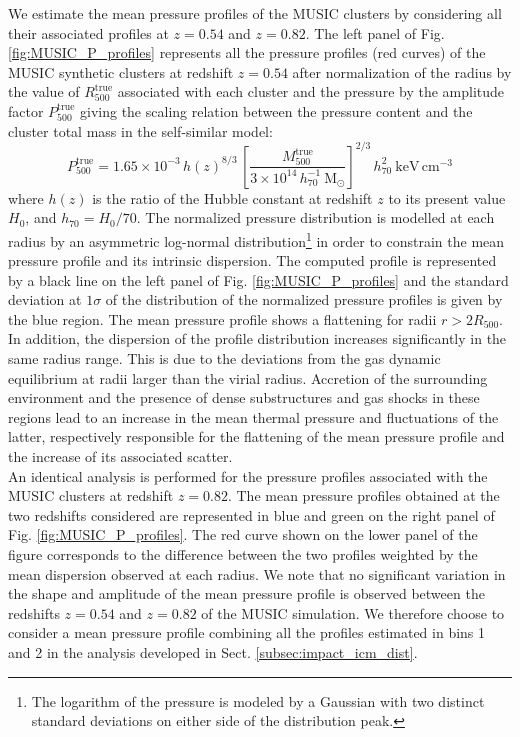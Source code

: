 \documentclass[twocolumn,traditabstract]{aa}
\begin{document}
We estimate the mean pressure profiles of the MUSIC clusters by considering all their associated profiles at $z=0.54$ and $z=0.82$. The left panel of Fig. \ref{fig:MUSIC_P_profiles} represents all the pressure profiles (red curves) of the MUSIC synthetic clusters at redshift $z=0.54$ after normalization of the radius by the value of $R_{500}^{\mathrm{true}}$ associated with each cluster and the pressure by the amplitude factor $P_{500}^{\mathrm{true}}$ giving the scaling relation between the pressure content and the cluster total mass in the self-similar model:
\begin{equation}
P_{500}^{\mathrm{true}} = 1.65 \times 10^{-3} \, h(z)^{8/3} \, \left[ \frac{M_{500}^{\mathrm{true}}}{3 \times 10^{14} \, h_{70}^{-1}~\mathrm{M_{\odot}}}\right]^{2/3} \, h_{70}^2~\mathrm{keV} \, \mathrm{cm^{-3}}
\end{equation}
where $h(z)$ is the ratio of the Hubble constant at redshift $z$ to its present value $H_0$, and $h_{70} = H_0 / 70$. The normalized pressure distribution is modelled at each radius by an asymmetric log-normal distribution\footnote{The logarithm of the pressure is modeled by a Gaussian with two distinct standard deviations on either side of the distribution peak.} in order to constrain the mean pressure profile and its intrinsic dispersion. The computed profile is represented by a black line on the left panel of Fig. \ref{fig:MUSIC_P_profiles} and the standard deviation at $1\sigma$ of the distribution of the normalized pressure profiles is given by the blue region. The mean pressure profile shows a flattening for radii $r>2R_{500}$. In addition, the dispersion of the profile distribution increases significantly in the same radius range. This is due to the deviations from the gas dynamic equilibrium at radii larger than the virial radius. Accretion of the surrounding environment and the presence of dense substructures and gas shocks in these regions lead to an increase in the mean thermal pressure and fluctuations of the latter, respectively responsible for the flattening of the mean pressure profile and the increase of its associated scatter.\\

An identical analysis is performed for the pressure profiles associated with the MUSIC clusters at redshift $z=0.82$. The mean pressure profiles obtained at the two redshifts considered are represented in blue and green on the right panel of Fig. \ref{fig:MUSIC_P_profiles}. The red curve shown on the lower panel of the figure corresponds to the difference between the two profiles weighted by the mean dispersion observed at each radius. We note that no significant variation in the shape and amplitude of the mean pressure profile is observed between the redshifts $z=0.54$ and $z=0.82$ of the MUSIC simulation. We therefore choose to consider a mean pressure profile combining all the profiles estimated in bins 1 and 2 in the analysis developed in Sect. \ref{subsec:impact_icm_dist}.\\
\end{document}
